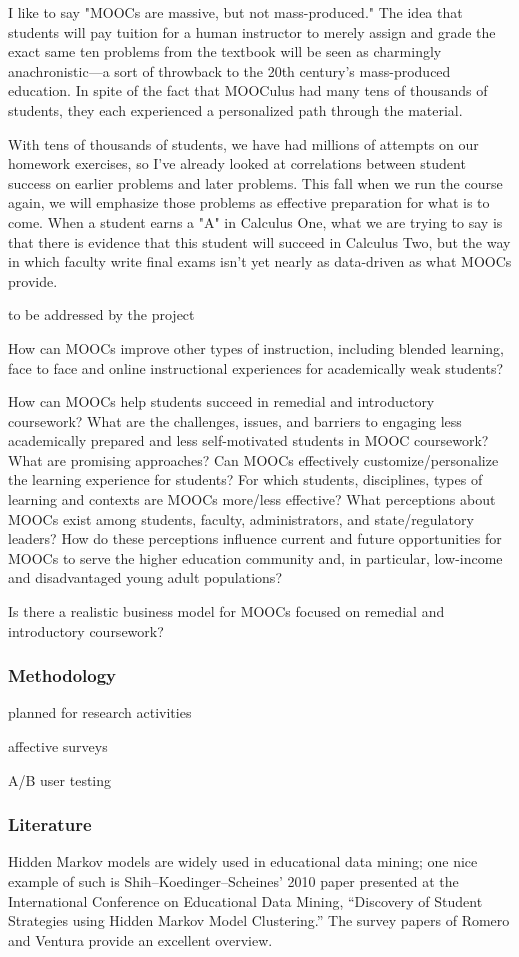 \documentclass[12pt]{article}
\begin{document}
I like to say "MOOCs are massive, but not mass-produced."  The idea
that students will pay tuition for a human instructor to merely assign
and grade the exact same ten problems from the textbook will be seen
as charmingly anachronistic---a sort of throwback to the 20th
century's mass-produced education.  In spite of the fact that MOOCulus
had many tens of thousands of students, they each experienced a
personalized path through the material.

With tens of thousands of students, we have had millions of attempts
on our homework exercises, so I've already looked at correlations
between student success on earlier problems and later problems.  This
fall when we run the course again, we will emphasize those problems as
effective preparation for what is to come.  When a student earns a "A"
in Calculus One, what we are trying to say is that there is evidence
that this student will succeed in Calculus Two, but the way in which
faculty write final exams isn't yet nearly as data-driven as what
MOOCs provide.

to be addressed by the project

How can MOOCs improve other types of instruction, including blended
learning, face to face and online instructional experiences for
academically weak students?

How can MOOCs help students succeed in remedial and introductory
coursework?  What are the challenges, issues, and barriers to engaging
less academically prepared and less self-motivated students in MOOC
coursework? What are promising approaches?  Can MOOCs effectively
customize/personalize the learning experience for students?  For which
students, disciplines, types of learning and contexts are MOOCs
more/less effective?  What perceptions about MOOCs exist among
students, faculty, administrators, and state/regulatory leaders? How
do these perceptions influence current and future opportunities for
MOOCs to serve the higher education community and, in particular,
low-income and disadvantaged young adult populations?

Is there a realistic business model for MOOCs focused on remedial and introductory coursework?

\subsubsection*{Methodology}

planned for research activities

affective surveys

A/B user testing

\subsubsection*{Literature}

Hidden Markov models are widely used in educational data mining; one
nice example of such is Shih--Koedinger--Scheines' 2010 paper
presented at the International Conference on Educational Data Mining,
``Discovery of Student Strategies using Hidden Markov Model
Clustering.''  The survey papers of Romero and Ventura provide an
excellent overview.
\end{document}
